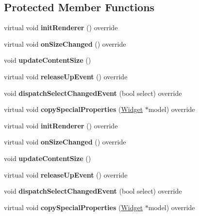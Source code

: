 \subsection*{Protected Member Functions}
\begin{DoxyCompactItemize}
\item 
\mbox{\label{classui_1_1TabHeader_a6d906f00ee75cf3dae1339077a56b08f}} 
virtual void {\bfseries init\+Renderer} () override
\item 
\mbox{\label{classui_1_1TabHeader_ab8472ca7763fb8eca171f2f5b9991d0a}} 
virtual void {\bfseries on\+Size\+Changed} () override
\item 
\mbox{\label{classui_1_1TabHeader_aaa560c5fc8d58093a2b62f38702d8fda}} 
void {\bfseries update\+Content\+Size} ()
\item 
\mbox{\label{classui_1_1TabHeader_acb186b56ea1c8a192e258148b5bc44d7}} 
virtual void {\bfseries release\+Up\+Event} () override
\item 
\mbox{\label{classui_1_1TabHeader_a9c1b9aa4a601e02c193d5c6c9890c0ab}} 
void {\bfseries dispatch\+Select\+Changed\+Event} (bool select) override
\item 
\mbox{\label{classui_1_1TabHeader_aaabacd3211a28e6747032358c71ae89f}} 
virtual void {\bfseries copy\+Special\+Properties} (\hyperlink{classui_1_1Widget}{Widget} $\ast$model) override
\item 
\mbox{\label{classui_1_1TabHeader_aefe505bc2f63e91affea6fd1f9df651a}} 
virtual void {\bfseries init\+Renderer} () override
\item 
\mbox{\label{classui_1_1TabHeader_a1e9026155015cd5e22b819fde726863d}} 
virtual void {\bfseries on\+Size\+Changed} () override
\item 
\mbox{\label{classui_1_1TabHeader_aaa560c5fc8d58093a2b62f38702d8fda}} 
void {\bfseries update\+Content\+Size} ()
\item 
\mbox{\label{classui_1_1TabHeader_a7fce6db33e38979e10fd2f99062b518b}} 
virtual void {\bfseries release\+Up\+Event} () override
\item 
\mbox{\label{classui_1_1TabHeader_a9c1b9aa4a601e02c193d5c6c9890c0ab}} 
void {\bfseries dispatch\+Select\+Changed\+Event} (bool select) override
\item 
\mbox{\label{classui_1_1TabHeader_a6779dcfb5bfc30a2e753a2d3693cabc2}} 
virtual void {\bfseries copy\+Special\+Properties} (\hyperlink{classui_1_1Widget}{Widget} $\ast$model) override
\end{DoxyCompactItemize}
